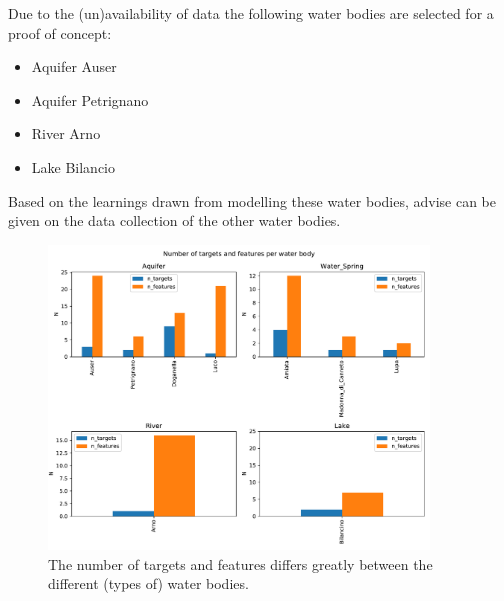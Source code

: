 \documentclass{article}
\begin{document}
Due to the (un)availability of data the following water bodies are selected for a proof of concept:
 \begin{itemize}
	\item Aquifer Auser
	\item Aquifer Petrignano
	\item River Arno
	\item Lake Bilancio
\end{itemize}
Based on the learnings drawn from modelling these water bodies, advise can be given on the data collection of the other water bodies.


\begin{figure}[p]
\begin{center}
\includegraphics[width=0.9\textwidth]{figs/Number_of_targets_and_features_per_water_body.pdf}
\caption{The number of targets and features differs greatly between the different (types of) water bodies.}
\label{fig:prep_ntargets}
\end{center}
\end{figure}
\end{document}
